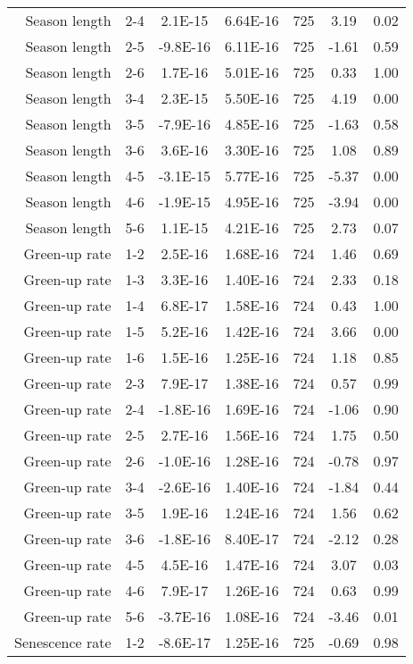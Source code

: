 \begin{table}[H]
\begin{tabular}{rcccccc}
  Season length & 2-4 & 2.1E-15 & 6.64E-16 & 725 & 3.19 & 0.02 \\ 
  Season length & 2-5 & -9.8E-16 & 6.11E-16 & 725 & -1.61 & 0.59 \\ 
  Season length & 2-6 & 1.7E-16 & 5.01E-16 & 725 & 0.33 & 1.00 \\ 
  Season length & 3-4 & 2.3E-15 & 5.50E-16 & 725 & 4.19 & 0.00 \\ 
  Season length & 3-5 & -7.9E-16 & 4.85E-16 & 725 & -1.63 & 0.58 \\ 
  Season length & 3-6 & 3.6E-16 & 3.30E-16 & 725 & 1.08 & 0.89 \\ 
  Season length & 4-5 & -3.1E-15 & 5.77E-16 & 725 & -5.37 & 0.00 \\ 
  Season length & 4-6 & -1.9E-15 & 4.95E-16 & 725 & -3.94 & 0.00 \\ 
  Season length & 5-6 & 1.1E-15 & 4.21E-16 & 725 & 2.73 & 0.07 \\ 
  Green-up rate & 1-2 & 2.5E-16 & 1.68E-16 & 724 & 1.46 & 0.69 \\ 
  Green-up rate & 1-3 & 3.3E-16 & 1.40E-16 & 724 & 2.33 & 0.18 \\ 
  Green-up rate & 1-4 & 6.8E-17 & 1.58E-16 & 724 & 0.43 & 1.00 \\ 
  Green-up rate & 1-5 & 5.2E-16 & 1.42E-16 & 724 & 3.66 & 0.00 \\ 
  Green-up rate & 1-6 & 1.5E-16 & 1.25E-16 & 724 & 1.18 & 0.85 \\ 
  Green-up rate & 2-3 & 7.9E-17 & 1.38E-16 & 724 & 0.57 & 0.99 \\ 
  Green-up rate & 2-4 & -1.8E-16 & 1.69E-16 & 724 & -1.06 & 0.90 \\ 
  Green-up rate & 2-5 & 2.7E-16 & 1.56E-16 & 724 & 1.75 & 0.50 \\ 
  Green-up rate & 2-6 & -1.0E-16 & 1.28E-16 & 724 & -0.78 & 0.97 \\ 
  Green-up rate & 3-4 & -2.6E-16 & 1.40E-16 & 724 & -1.84 & 0.44 \\ 
  Green-up rate & 3-5 & 1.9E-16 & 1.24E-16 & 724 & 1.56 & 0.62 \\ 
  Green-up rate & 3-6 & -1.8E-16 & 8.40E-17 & 724 & -2.12 & 0.28 \\ 
  Green-up rate & 4-5 & 4.5E-16 & 1.47E-16 & 724 & 3.07 & 0.03 \\ 
  Green-up rate & 4-6 & 7.9E-17 & 1.26E-16 & 724 & 0.63 & 0.99 \\ 
  Green-up rate & 5-6 & -3.7E-16 & 1.08E-16 & 724 & -3.46 & 0.01 \\ 
  Senescence rate & 1-2 & -8.6E-17 & 1.25E-16 & 725 & -0.69 & 0.98 \\ 

\end{tabular}
\end{table}
